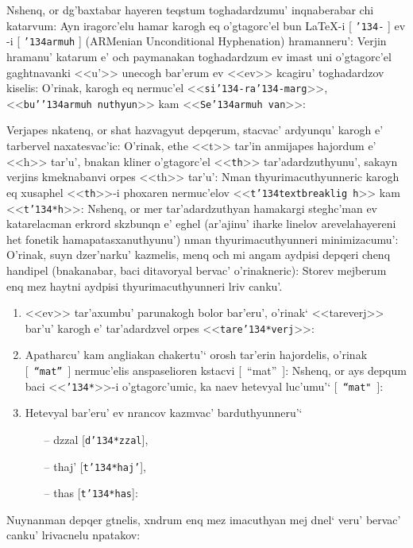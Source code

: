 \documentclass[12pt,a4paper]{article}
\def\mybs{\char'134}
\begin{document}
Nshenq, or dg'baxtabar hayeren teqstum toghadardzumu' inq\-na\-be\-ra\-bar chi
katarvum: Ayn iragorc'elu hamar karogh eq o'gtagorc'el bun {\rm \LaTeX}-i [
{\tt \mybs-} ] ev \ArmTeX-i [ {\tt\mybs armuh} ] ({\aroff ARMenian
Unconditional Hyphenation}) hramanneru': Verjin hramanu' katarum e' och
paymanakan toghadardzum ev imast uni o'gtagorc'el gaghtnavanki <<u'>> unecogh
ba\-r'e\-rum ev <<ev>> kcagiru' toghadardzov kiselis: O'rinak, karogh eq
nermuc'el <<{\tt si\mybs-ra\mybs-marg}>>, <<{\tt bu'\mybs armuh\ nuthyun}>>
kam <<{\tt Se\mybs armuh\ van}>>:

Verjapes nkatenq, or shat hazvagyut depqerum, stacvac' ar\-dyun\-qu' karogh e'
tarbervel naxatesvac'ic: O'rinak, ethe <<t>> tar'in anmijapes hajordum e'
<<h>> tar'u', bnakan kliner o'gtagorc'el <<{\tt th}>>
ta\-r'a\-dar\-dzu\-thyu\-nu', sakayn verjins kmeknabanvi orpes <<th>> tar'u':
Nman thyurimacuthyunneric karogh eq xusaphel <<{\tt th}>>-i phoxaren
nermuc'elov <<{\tt t\mybs textbreaklig h}>> kam <<{\tt t\mybs *h}>>: Nshenq,
or mer tar'adardzuthyan ha\-ma\-kar\-gi steghc'man ev katarelacman erkrord
skzbunqn e' eghel (ar'ajinu' iharke linelov arevelahayereni het fonetik
hamapatasxanuthyunu') nman thyurimacuthyunneri minimizacumu': O'rinak, suyn
dzer'narku' kaz\-me\-lis, menq och mi angam aydpisi depqeri chenq handipel
(bnakanabar, baci ditavoryal bervac' o'rinakneric): Storev mejberum enq mez
hayt\-ni aydpisi thyurimacuthyunneri lriv canku'.
\begin{enumerate}
\item <<e\*v>> tar'axumbu' parunakogh bolor bar'eru', o'rinak` <<tare\*verj>>
bar'u' karogh e' tar'adardzvel orpes <<{\tt tare\mybs *verj}>>:
\item Apatharcu' kam angliakan chakertu'` orosh tar'erin hajordelis, o'rinak
[~{\tt ``mat''}~] nermuc'elis anspaselioren kstacvi [~``mat''~]: Nshenq, or
ays depqum baci <<{\tt \mybs *}>>-i o'gtagorc'umic, ka naev hetevyal
luc'umu'` [~{\tt ``mat"}~]:
\item Hetevyal bar'eru' ev nrancov kazmvac' barduthyunneru'`
\begin{itemize}
\item[--]d\*zzal [{\tt d\mybs *zzal}],
\item[--]t\*haj' [{\tt t\mybs *haj'}],
\item[--]t\*has [{\tt t\mybs *has}]:
\end{itemize}
\end{enumerate}
Nuynanman depqer gtnelis, xndrum enq mez imacuthyan mej dnel` veru' bervac'
canku' lrivacnelu npatakov:
\end{document}

